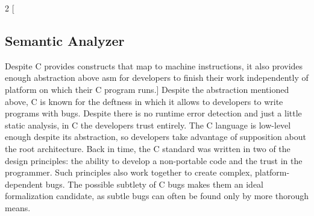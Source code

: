 \begin{minipage}{\linewidth}
	\begin{multicols*}{2}
		[
		\vspace{6 mm}
		\subsection{Semantic Analyzer}
		Despite C provides constructs that map to machine instructions, it also provides enough abstraction above \gls{asm} for developers to finish their work independently of platform  on which their C program runs.]
		Despite the abstraction mentioned above, C is known for the deftness in which it allows to developers to write programs with bugs. Despite there is no runtime error detection and just a little static analysis, in C the developers trust entirely. The C language is low-level enough despite its abstraction, so developers take advantage of supposition about the root architecture.  
		Back in time, the C standard was written in two of the design principles: the ability to develop a non-portable code and the trust in the programmer\cite{AmericanNationalStandardsInstitute:1990:RAC:533966}. Such principles also work together to create complex, platform-dependent bugs. The possible subtlety of C bugs makes them an ideal formalization candidate, as subtle bugs can often be found only by more thorough means.
		

\end{multicols*}
\end{minipage}
